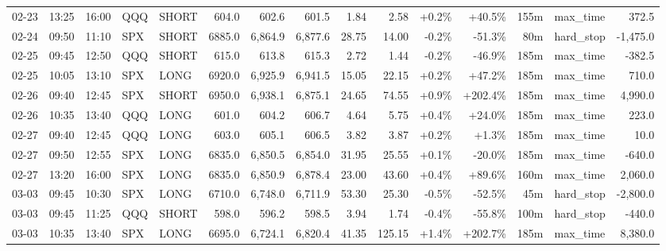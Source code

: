 \documentclass[11pt,a4paper,twoside]{article}
\begin{document}
\begin{landscape}
\begin{center}
\begin{longtable}{>{\color{txtmain}}l l l l l r r r r r r r r >{\color{txtmain}}l r}
02-23 & 13:25 & 16:00 & QQQ & SHORT & 604.0 & 602.6 & 601.5 & 1.84 & 2.58 & \textcolor{wingreen}{+0.2\%} & \textcolor{wingreen}{+40.5\%} & 155m & max\_time & \textcolor{wingreen}{372.5} \\
02-24 & 09:50 & 11:10 & SPX & SHORT & 6885.0 & 6,864.9 & 6,877.6 & 28.75 & 14.00 & \textcolor{lossred}{-0.2\%} & \textcolor{lossred}{-51.3\%} & 80m & hard\_stop & \textcolor{lossred}{-1,475.0} \\
02-25 & 09:45 & 12:50 & QQQ & SHORT & 615.0 & 613.8 & 615.3 & 2.72 & 1.44 & \textcolor{lossred}{-0.2\%} & \textcolor{lossred}{-46.9\%} & 185m & max\_time & \textcolor{lossred}{-382.5} \\
02-25 & 10:05 & 13:10 & SPX & LONG & 6920.0 & 6,925.9 & 6,941.5 & 15.05 & 22.15 & \textcolor{wingreen}{+0.2\%} & \textcolor{wingreen}{+47.2\%} & 185m & max\_time & \textcolor{wingreen}{710.0} \\
02-26 & 09:40 & 12:45 & SPX & SHORT & 6950.0 & 6,938.1 & 6,875.1 & 24.65 & 74.55 & \textcolor{wingreen}{+0.9\%} & \textcolor{wingreen}{+202.4\%} & 185m & max\_time & \textcolor{wingreen}{4,990.0} \\
02-26 & 10:35 & 13:40 & QQQ & LONG & 601.0 & 604.2 & 606.7 & 4.64 & 5.75 & \textcolor{wingreen}{+0.4\%} & \textcolor{wingreen}{+24.0\%} & 185m & max\_time & \textcolor{wingreen}{223.0} \\
02-27 & 09:40 & 12:45 & QQQ & LONG & 603.0 & 605.1 & 606.5 & 3.82 & 3.87 & \textcolor{wingreen}{+0.2\%} & \textcolor{wingreen}{+1.3\%} & 185m & max\_time & \textcolor{wingreen}{10.0} \\
02-27 & 09:50 & 12:55 & SPX & LONG & 6835.0 & 6,850.5 & 6,854.0 & 31.95 & 25.55 & \textcolor{wingreen}{+0.1\%} & \textcolor{lossred}{-20.0\%} & 185m & max\_time & \textcolor{lossred}{-640.0} \\
02-27 & 13:20 & 16:00 & SPX & LONG & 6835.0 & 6,850.9 & 6,878.4 & 23.00 & 43.60 & \textcolor{wingreen}{+0.4\%} & \textcolor{wingreen}{+89.6\%} & 160m & max\_time & \textcolor{wingreen}{2,060.0} \\
03-03 & 09:45 & 10:30 & SPX & LONG & 6710.0 & 6,748.0 & 6,711.9 & 53.30 & 25.30 & \textcolor{lossred}{-0.5\%} & \textcolor{lossred}{-52.5\%} & 45m & hard\_stop & \textcolor{lossred}{-2,800.0} \\
03-03 & 09:45 & 11:25 & QQQ & SHORT & 598.0 & 596.2 & 598.5 & 3.94 & 1.74 & \textcolor{lossred}{-0.4\%} & \textcolor{lossred}{-55.8\%} & 100m & hard\_stop & \textcolor{lossred}{-440.0} \\
03-03 & 10:35 & 13:40 & SPX & LONG & 6695.0 & 6,724.1 & 6,820.4 & 41.35 & 125.15 & \textcolor{wingreen}{+1.4\%} & \textcolor{wingreen}{+202.7\%} & 185m & max\_time & \textcolor{wingreen}{8,380.0} \\

\end{longtable}
\end{center}
\end{landscape}
\end{document}

